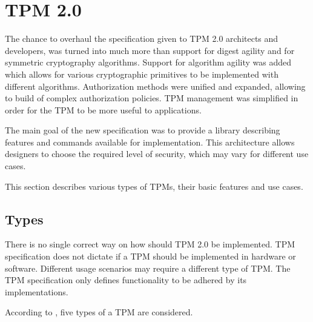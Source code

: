\section{TPM 2.0}
The chance to overhaul the specification given to TPM 2.0 architects and developers, was turned into much more than support for digest agility and for symmetric cryptography algorithms. Support for algorithm agility was added which allows for various cryptographic primitives to be implemented with different algorithms. Authorization methods were unified and expanded, allowing  to build of complex authorization policies. TPM management was simplified in order for the TPM to be more useful to applications.

The main goal of the new specification was to provide a library describing features and commands available for implementation. This architecture allows designers to choose the required level of security, which may vary for different use cases. 

This section describes various types of TPMs, their basic features and use cases.

\subsection{Types}
There is no single correct way on how should TPM 2.0 be implemented. TPM specification does not dictate if a TPM should be implemented in hardware or software. Different usage scenarios may require a different type of TPM. The TPM specification only defines functionality to be adhered by its implementations. 

According to \cite{tcg_tpm2_briefintro}, five types of a TPM are considered.

